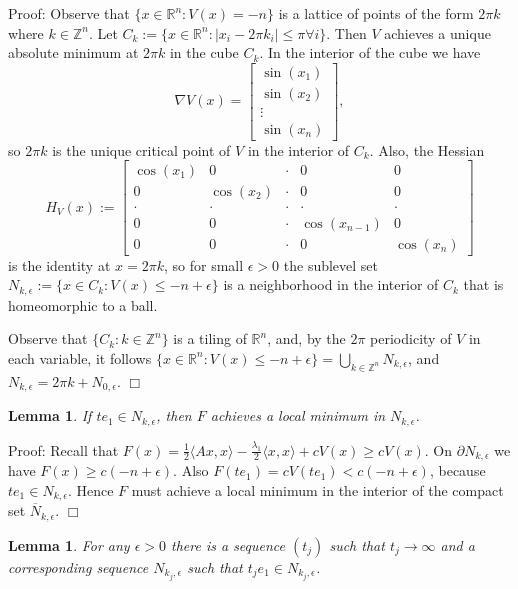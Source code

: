 \documentclass[twoside]{article}
\newtheorem{lemma}[theorem]{Lemma}
\newcommand{\R}{{\mathbb R}}
\newcommand{\Z}{{\mathbb Z}}
\begin{document}
Proof: Observe that $\{x\in\R^n:V(x)=-n\}$ is a lattice of points of the form $2\pi k$ where $k\in\Z^n$. Let $C_k:=\{x\in\R^n:|x_i-2\pi k_i|\leq \pi\forall i\}$. Then $V$ achieves a unique absolute minimum at $2\pi k$ in the cube $C_k$. In the interior of the cube we have
\[
\nabla V(x)=\left [ \begin{array}{c} \sin(x_1)\\ \sin(x_2)\\ \vdots \\ \sin(x_n) \end{array} \right ],
\]
so $2\pi k$ is the unique critical point of $V$ in the interior of $C_k$. Also, the Hessian
\[
H_V(x):=\left [ \begin{array}{ccccc} \cos(x_1)& 0&\cdot&0&0\\ 0 & \cos(x_2) & \cdot & 0 & 0\\ \cdot & \cdot & \cdot & \cdot & \cdot \\0 & 0& \cdot & \cos(x_{n-1}) & 0 \\ 0 & 0 & \cdot & 0 & \cos(x_n)\end{array}\right ]
\]
is the identity at $x=2\pi k$, so for small $\epsilon>0$ the sublevel set $N_{k,\epsilon}:=\{x\in C_k: V(x)\leq -n+\epsilon\}$ is a neighborhood in the interior of $C_k$ that is homeomorphic to a ball.

Observe that $\{C_k:k\in\Z^n\}$ is a tiling of $\R^n$, and, by the $2\pi$ periodicity of $V$ in each variable, it follows $\{x\in \R^n: V(x)\leq -n+\epsilon\}=\bigcup_{k\in\Z^n}N_{k,\epsilon}$, and $N_{k,\epsilon}=2\pi k +N_{0,\epsilon}$. $\Box$

\begin{lemma}
If $te_1\in N_{k,\epsilon}$, then $F$ achieves a local minimum in $N_{k,\epsilon}$.
\end{lemma}

Proof: Recall that $F(x)=\frac{1}{2}\langle Ax,x\rangle-\frac{\lambda_1}{2}\langle x,x\rangle+cV(x)\geq cV(x)$. On $\partial N_{k,\epsilon}$ we have $F(x)\geq c(-n+\epsilon)$. Also $F(te_1)=cV(te_1)<c(-n+\epsilon)$, because $te_1\in N_{k,\epsilon}$. Hence $F$ must achieve a local minimum in the interior of the compact set $\overline{N}_{k,\epsilon}$. $\Box$


\begin{lemma}
For any $\epsilon>0$ there is a sequence $(t_j)$ such that $t_j\rightarrow\infty$ and a corresponding sequence $N_{k_j,\epsilon}$ such that $t_je_1\in N_{k_j,\epsilon}$.
\end{lemma}
\end{document}
